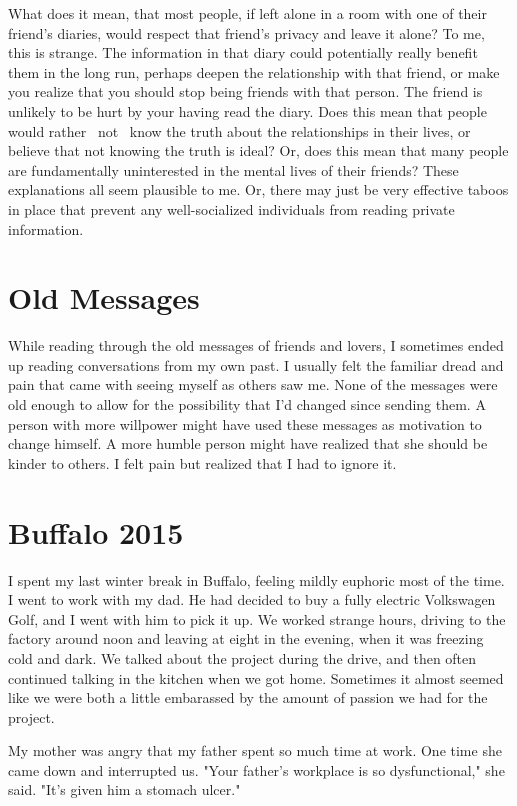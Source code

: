 \documentclass[12pt]{article}
\begin{document}
What does it mean, that most people, if left alone in a room with one of their
friend's diaries, would respect that friend's privacy and leave it alone?  To
me, this is strange.  The information in that diary could potentially really
benefit them in the long run, perhaps deepen the relationship with that friend,
or make you realize that you should stop being friends with that person.  The
friend is unlikely to be hurt by your having read the diary.  Does this mean
that people would rather ~not~ know the truth about the relationships in their
lives, or believe that not knowing the truth is ideal?  Or, does this mean that
many people are fundamentally uninterested in the mental lives of their friends?
These explanations all seem plausible to me.  Or, there may just be very
effective taboos in place that prevent any well-socialized individuals from
reading private information.

\section{Old Messages}
While reading through the old messages of friends and lovers, I sometimes ended
up reading conversations from my own past.  I usually felt the familiar dread
and pain that came  with seeing myself as others saw me.  None of the messages
were old enough to allow for the possibility that I'd changed since sending
them.  A person with more willpower might have used these messages as motivation
to change himself.  A more humble person might have realized that she should be
kinder to others.  I felt pain but realized that I had to ignore it.

\section{Buffalo 2015}
I spent my last winter break in Buffalo, feeling mildly euphoric most of the
time.  I went to work with my dad.  He had decided to buy a fully electric
Volkswagen Golf, and I went with him to pick it up.  We worked strange hours,
driving to the factory around noon and leaving at eight in the evening, when it
was freezing cold and dark.  We talked about the project during the drive, and
then often continued talking in the kitchen when we got home.  Sometimes it
almost seemed like we were both a little embarassed by the amount of passion we
had for the project. 

My mother was angry that my father spent so much time at work.  One time she
came down and interrupted us.  "Your father's workplace is so dysfunctional,"
she said.  "It's given him a stomach ulcer."  
\end{document}
